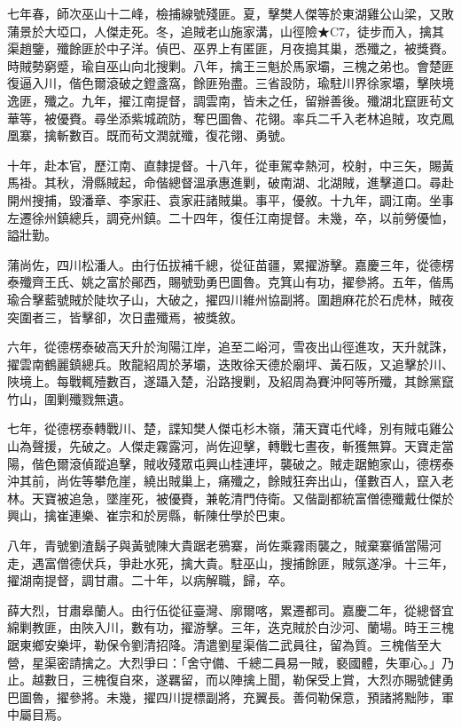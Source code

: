 \begin{pinyinscope}
七年春，師次巫山十二峰，檢捕線號殘匪。夏，擊樊人傑等於東湖雞公山梁，又敗蒲景於大埡口，人傑走死。冬，追賊老山施家溝，山徑險★C7，徒步而入，擒其渠趙鑒，殲餘匪於中子洋。偵巴、巫界上有匿匪，月夜搗其巢，悉殲之，被獎賚。時賊勢窮蹙，瑜自巫山向北搜剿。八年，擒王三魁於馬家壩，三槐之弟也。會楚匪復逼入川，偕色爾滾破之鐙盞窩，餘匪殆盡。三省設防，瑜駐川界徐家壩，擊陜境逸匪，殲之。九年，擢江南提督，調雲南，皆未之任，留辦善後。殲湖北竄匪茍文華等，被優賚。尋坐添紫城疏防，奪巴圖魯、花翎。率兵二千入老林追賊，攻克鳳凰寨，擒斬數百。既而茍文潤就殲，復花翎、勇號。

十年，赴本官，歷江南、直隸提督。十八年，從車駕幸熱河，校射，中三矢，賜黃馬褂。其秋，滑縣賊起，命偕總督溫承惠進剿，破南湖、北湖賊，進擊道口。尋赴開州搜捕，毀潘章、李家莊、袁家莊諸賊巢。事平，優敘。十九年，調江南。坐事左遷徐州鎮總兵，調兗州鎮。二十四年，復任江南提督。未幾，卒，以前勞優恤，謚壯勤。

蒲尚佐，四川松潘人。由行伍拔補千總，從征苗疆，累擢游擊。嘉慶三年，從德楞泰殲齊王氏、姚之富於鄖西，賜號勁勇巴圖魯。克箕山有功，擢參將。五年，偕馬瑜合擊藍號賊於陡坎子山，大破之，擢四川維州協副將。圍趙麻花於石虎林，賊夜突圍者三，皆擊卻，次日盡殲焉，被獎敘。

六年，從德楞泰破高天升於洵陽江岸，追至二峪河，雪夜出山徑進攻，天升就誅，擢雲南鶴麗鎮總兵。敗龍紹周於茅壩，迭敗徐天德於廟坪、黃石阪，又追擊於川、陜境上。每戰輒殪數百，遂躡入楚，沿路搜剿，及紹周為賽沖阿等所殲，其餘黨竄竹山，圍剿殲戮無遺。

七年，從德楞泰轉戰川、楚，諜知樊人傑屯杉木嶺，蒲天寶屯代峰，別有賊屯雞公山為聲援，先破之。人傑走霧露河，尚佐迎擊，轉戰七晝夜，斬獲無算。天寶走當陽，偕色爾滾偵蹤追擊，賊收殘眾屯興山桂連坪，襲破之。賊走踞鮑家山，德楞泰沖其前，尚佐等攀危崖，繞出賊巢上，痛殲之，餘賊狂奔出山，僅數百人，竄入老林。天寶被追急，墜崖死，被優賚，兼乾清門侍衛。又偕副都統富僧德殲戴仕傑於興山，擒崔連樂、崔宗和於房縣，斬陳仕學於巴東。

八年，青號劉渣鬍子與黃號陳大貴踞老鴉寨，尚佐乘霧雨襲之，賊棄寨循當陽河走，遇富僧德伏兵，爭赴水死，擒大貴。駐巫山，搜捕餘匪，賊氛遂凈。十三年，擢湖南提督，調甘肅。二十年，以病解職，歸，卒。

薛大烈，甘肅皋蘭人。由行伍從征臺灣、廓爾喀，累遷都司。嘉慶二年，從總督宜綿剿教匪，由陜入川，數有功，擢游擊。三年，迭克賊於白沙河、蘭場。時王三槐踞東鄉安樂坪，勒保令劉清招降。清遣劉星渠偕二武員往，留為質。三槐偕至大營，星渠密請擒之。大烈爭曰：「舍守備、千總二員易一賊，褻國體，失軍心。」乃止。越數日，三槐復自來，遂羈留，而以陣擒上聞，勒保受上賞，大烈亦賜號健勇巴圖魯，擢參將。未幾，擢四川提標副將，充翼長。善伺勒保意，預諸將黜陟，軍中屬目焉。


\end{pinyinscope}
